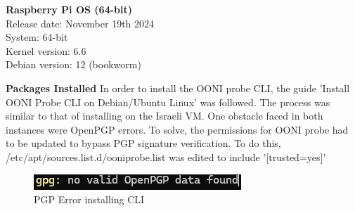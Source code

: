\begin{flushleft}
\hspace{1em}\textbf{Raspberry Pi OS (64-bit)}\\[0.5em]
\hspace{1em}Release date: November 19th 2024\\[0.5em]
\hspace{1em}System: 64-bit\\[0.5em]
\hspace{1em}Kernel version: 6.6\\[0.5em]
\hspace{1em}Debian version: 12 (bookworm)
\end{flushleft}


\textbf{Packages Installed}
In order to install the OONI probe CLI, the guide 'Install OONI Probe CLI on Debian/Ubuntu Linux' \cite{ooni-cli-install} was followed. The process was similar to that of installing on the Israeli VM. One obstacle faced in both instances were OpenPGP errors. To solve, the permissions for OONI probe had to be updated to bypass PGP signature verification. To do this, /etc/apt/sources.list.d/ooniprobe.list was edited to include '[trusted=yes]'

\begin{figure} [H]
    \centering
    \includegraphics[width=0.75\linewidth]{PGPERROR.png}
    \caption{PGP Error installing CLI}
    \label{fig:enter-label}
\end{figure}



